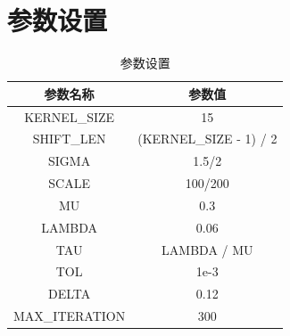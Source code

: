 \documentclass[a4paper, UTF8]{ctexrep}
\begin{document}
		\section{参数设置}
			\begin{table}[htbp!]
				\centering
				\begin{tabular}{cc}
				\hline
				参数名称 & 参数值 \\
				\hline
				KERNEL\_SIZE & 15 \\
				SHIFT\_LEN & (KERNEL\_SIZE - 1) / 2 \\
				SIGMA & 1.5/2 \\
				SCALE & 100/200 \\
				MU & 0.3 \\
				LAMBDA & 0.06 \\
				TAU & LAMBDA / MU \\
				TOL & 1e-3 \\
				DELTA & 0.12 \\
				MAX\_ITERATION & 300 \\
				\hline
				\end{tabular}
				\caption{参数设置}
			\end{table}
\end{document}

